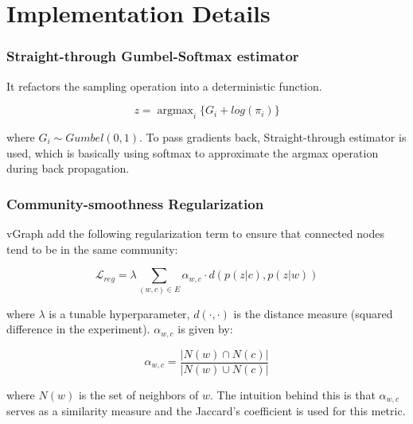\documentclass[12pt,aspectratio=169]{beamer}
\begin{document}

    \section{Implementation Details}

    \begin{frame}
        \frametitle{Straight-through Gumbel-Softmax estimator}

        It refactors the sampling operation into a deterministic function.

        $$ z = \mathop{argmax}_i\{{G_i + log(\pi_i)}\} $$

        where $G_i \sim Gumbel(0, 1)$. To pass gradients back, Straight-through estimator is used, which is basically using
        softmax to approximate the argmax operation during back propagation.
    \end{frame}

    \begin{frame}
        \frametitle{Community-smoothness Regularization}

        vGraph add the following regularization term to ensure that connected nodes tend to be in the same community:

        $$ \mathcal{L}_{reg} = \lambda\sum_{(w,c)\in E}\alpha_{w,c}\cdot d(p(z|c),p(z|w)) $$

        where $\lambda$ is a tunable hyperparameter, $d(\cdot,\cdot)$ is the distance measure (squared difference in the
        experiment). $\alpha_{w,c}$ is given by:

        $$ \alpha_{w,c} = \frac{\vert N(w) \cap N(c)\vert}{\vert N(w) \cup N(c)\vert} $$

        where $N(w)$ is the set of neighbors of $w$. The intuition behind this is that $\alpha_{w,c}$ serves as a
        similarity measure and the Jaccard's coefficient is used for this metric.
    \end{frame}
\end{document}

